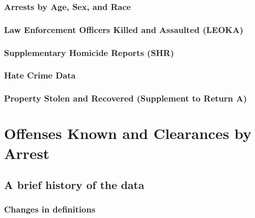 \documentclass[
  12pt,
  openany]{book}
\begin{document}
\hypertarget{arrests-by-age-sex-and-race}{%
\subsection{Arrests by Age, Sex, and Race}\label{arrests-by-age-sex-and-race}}

\hypertarget{law-enforcement-officers-killed-and-assaulted-leoka}{%
\subsection{Law Enforcement Officers Killed and Assaulted (LEOKA)}\label{law-enforcement-officers-killed-and-assaulted-leoka}}

\hypertarget{supplementary-homicide-reports-shr}{%
\subsection{Supplementary Homicide Reports (SHR)}\label{supplementary-homicide-reports-shr}}

\hypertarget{hate-crime-data}{%
\subsection{Hate Crime Data}\label{hate-crime-data}}

\hypertarget{property-stolen-and-recovered-supplement-to-return-a}{%
\subsection{Property Stolen and Recovered (Supplement to Return A)}\label{property-stolen-and-recovered-supplement-to-return-a}}

\hypertarget{offenses_known}{%
\chapter{Offenses Known and Clearances by Arrest}\label{offenses_known}}

\hypertarget{a-brief-history-of-the-data}{%
\section{A brief history of the data}\label{a-brief-history-of-the-data}}

\hypertarget{changes-in-definitions}{%
\subsection{Changes in definitions}\label{changes-in-definitions}}
\end{document}
